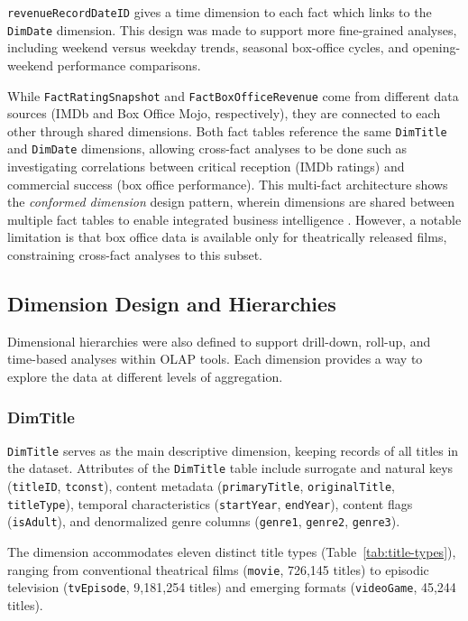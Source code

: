 \texttt{revenueRecordDateID} gives a time dimension to each fact which links to the \texttt{DimDate} dimension. This design was made to support more fine-grained analyses, including weekend versus weekday trends, seasonal box-office cycles, and opening-weekend performance comparisons.

While \texttt{FactRatingSnapshot} and \texttt{FactBoxOfficeRevenue} come from different data sources (IMDb and Box Office Mojo, respectively), they are connected to each other through shared dimensions. Both fact tables reference the same \texttt{DimTitle} and \texttt{DimDate} dimensions, allowing cross-fact analyses to be done such as investigating correlations between critical reception (IMDb ratings) and commercial success (box office performance). This multi-fact architecture shows the \textit{conformed dimension} design pattern, wherein dimensions are shared between multiple fact tables to enable integrated business intelligence \cite{kimball2013datawarehouse}. However, a notable limitation is that box office data is available only for theatrically released films, constraining cross-fact analyses to this subset.

\subsection{Dimension Design and Hierarchies}

Dimensional hierarchies were also defined to support drill-down, roll-up, and time-based analyses within OLAP tools. Each dimension provides a way to explore the data at different levels of aggregation.

\subsubsection{DimTitle}

\texttt{DimTitle} serves as the main descriptive dimension, keeping records of all titles in the dataset. Attributes of the \texttt{DimTitle} table include surrogate and natural keys (\texttt{titleID}, \texttt{tconst}), content metadata (\texttt{primaryTitle}, \texttt{originalTitle}, \texttt{titleType}), temporal characteristics (\texttt{startYear}, \texttt{endYear}), content flags (\texttt{isAdult}), and denormalized genre columns (\texttt{genre1}, \texttt{genre2}, \texttt{genre3}).

The dimension accommodates eleven distinct title types (Table~\ref{tab:title-types}), ranging from conventional theatrical films (\texttt{movie}, 726,145 titles) to episodic television (\texttt{tvEpisode}, 9,181,254 titles) and emerging formats (\texttt{videoGame}, 45,244 titles).

